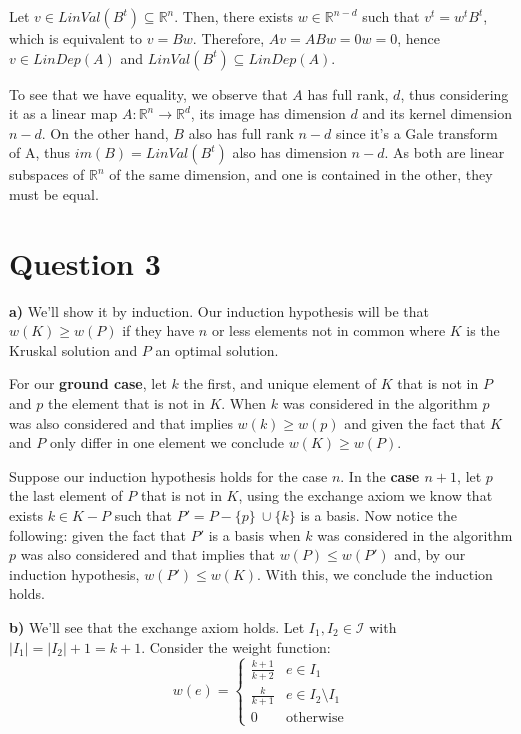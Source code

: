 \documentclass[12pt]{article}
\begin{document}
Let $v \in LinVal(B^{t}) \subseteq \mathbb{R}^{n}$. Then, there exists $w \in \mathbb{R}^{n-d}$ such that $v^{t} = w^{t}B^{t}$, which is equivalent to $v = Bw$. Therefore, $Av = ABw = 0w = 0$, hence $v \in LinDep(A)$ and $LinVal(B^{t}) \subseteq LinDep(A)$.

To see that we have equality, we observe that $A$ has full rank, $d$, thus considering it as a linear map $A : \mathbb{R}^{n} \longrightarrow \mathbb{R}^{d}$, its image has dimension $d$ and its kernel dimension $n-d$. On the other hand, $B$ also has full rank $n-d$ since it's a Gale transform of A, thus $im(B) = LinVal(B^{t})$ also has dimension $n-d$. As both are linear subspaces of $\mathbb{R}^{n}$ of the same dimension, and one is contained in the other, they must be equal.

\section{Question 3}

\textbf{a)} We'll show it by induction. Our induction hypothesis will be that $w(K)\geq w(P)$ if they have $n$ or less elements not in common where $K$ is the Kruskal solution and $P$ an optimal solution.

For our \textbf{ground case}, let $k$ the first, and unique element of $K$ that is not in $P$ and $p$ the element that is not in $K$. When $k$ was considered in the algorithm $p$ was also considered and that implies $w(k)\geq w(p)$ and given the fact that $K$ and $P$ only differ in one element we conclude $w(K)\geq w(P)$.

Suppose our induction hypothesis holds for the case $n$. In the \textbf{case $n+1$}, let $p$ the last element of $P$ that is not in $K$, using the exchange axiom we know that exists $k \in K-P$ such that $P'=P- \lbrace p \rbrace \ \cup \lbrace k \rbrace$ is a basis. Now notice the following: given the fact that $P'$ is a basis when $k$ was considered in the algorithm $p$ was also considered and that implies that $w(P)\leq w(P')$ and, by our induction hypothesis, $w(P')\leq w(K)$. With this, we conclude the induction holds.

\textbf{b)} We'll see that the exchange axiom holds. Let $I_{1}, I_{2} \in \mathcal{I}$ with $|I_{1}|=|I_{2}|+1=k+1$. Consider the weight function:
$$
w(e)=
\begin{cases}
\frac{k+1}{k+2} & e\in I_{1}\\
\frac{k}{k+1} & e\in I_{2} \setminus I_{1}\\
0 & \text{otherwise} 
\end{cases}
$$
\end{document}
